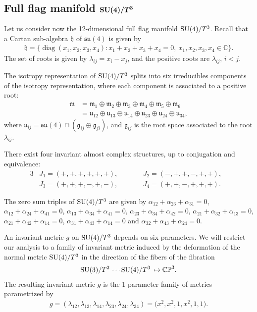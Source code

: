 \documentclass[10pt,a4paper]{amsart}
\numberwithin{equation}{section}
\DeclareMathOperator{\Diag}{diag}
\begin{document}
\subsection[Full flag manifold \protect{SU(4)/T\textasciicircum{}3}]
{Full flag manifold $\boldsymbol{{\rm SU}(4)/T^3}$}

Let us consider now the 12-dimensional full flag manifold ${\rm SU}(4)/T^3$. Recall that a Cartan sub-algebra $\mathfrak{h}$ of $\mathfrak{su}(4)$ is given by
\begin{gather*}
\mathfrak{h}=\{\Diag(x_1,x_2,x_3,x_4)\colon x_1+x_2+x_3+x_4=0,\ x_1,x_2,x_3,x_4 \in\mathbb{C}\}.
\end{gather*}
The set of roots is given by $\lambda_{ij}=x_i - x_j$, and the positive roots are $\lambda_{ij}$, $i<j$.

The isotropy representation of ${\rm SU}(4)/T^3$ splits into six irreducibles components of the isotropy representation, where each component is associated to a positive root:
\begin{align*}
\mathfrak{m}&=\mathfrak{m}_{1}\oplus\mathfrak{m}_{2}\oplus \mathfrak{m}_{3}\oplus\mathfrak{m}_{4}\oplus\mathfrak{m}_{5}\oplus \mathfrak{m}_{6}
\\
&=\mathfrak{u}_{12}\oplus \mathfrak{u}_{13}\oplus \mathfrak{u}_{14}\oplus \mathfrak{u}_{23}\oplus \mathfrak{u}_{24}\oplus \mathfrak{u}_{34},
\end{align*}
where $\mathfrak{u}_{ij}=\mathfrak{su}(4)\cap (\mathfrak{g}_{ij}\oplus \mathfrak{g}_{ji})$, and $\mathfrak{g}_{ij}$ is the root space associated to the root $\lambda_{ij}$.

There exist four invariant almost complex structures, up to conjugation and equivalence:
\begin{alignat*}{3}
& J_{1}=(+,+,+,+,+,+),\qquad &&J_{2}=(-,+,+,-,+,+),&\\
&J_{3}=(+,+,+,-,+,-),\qquad &&J_{4}=(+,+,-,+,+,+).&
\end{alignat*}

The zero sum triples of ${\rm SU}(4)/T^3$ are given by
$\alpha_{12}+\alpha_{23}+\alpha_{31}=0$, $\alpha_{12}+\alpha_{24}+\alpha_{41}=0$, $\alpha_{13}+\alpha_{34}+\alpha_{41}=0$,
$\alpha_{23}+\alpha_{34}+\alpha_{42}=0$, $\alpha_{21}+\alpha_{32}+\alpha_{13}=0$, $\alpha_{21}+\alpha_{42}+\alpha_{14}=0$, $\alpha_{31}+\alpha_{43}+\alpha_{14}=0$ and $\alpha_{32}+\alpha_{43}+\alpha_{24}=0$.

An invariant metric $g$ on $ {\rm SU}(4)/T^3$ depends on six parameters. We will restrict our analysis to a family of invariant metric induced by the deformation of the normal metric ${\rm SU}(4)/T^3$ in the direction of the fibers of the fibration
\begin{gather*}
{\rm SU}(3)/T^2 \, \cdots {\rm SU}(4)/T^3 \, \mapsto \mathbb{CP}^3.
\end{gather*}
The resulting invariant metric $g$ is the 1-parameter family of metrics parametrized by
\begin{gather} \label{metric-su4}
 g=(\lambda_{12},\lambda_{13},\lambda_{14},\lambda_{23},\lambda_{24},\lambda_{34})=\big(x^{2},x^{2},1,x^{2},1,1\big).
 \end{gather}
\end{document}
